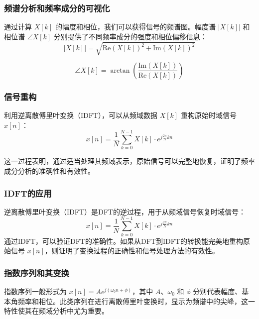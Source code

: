 \documentclass[a4paper,12pt]{article}
\begin{document}
\subsubsection{频谱分析和频率成分的可视化}

通过计算 \( X[k] \) 的幅度和相位，我们可以获得信号的频谱图。幅度谱 \( |X[k]| \) 和相位谱 \( \angle X[k] \) 分别提供了不同频率成分的强度和相位偏移信息：
\begin{equation}
|X[k]| = \sqrt{\text{Re}(X[k])^2 + \text{Im}(X[k])^2}
\end{equation}

\begin{equation}
\angle X[k] = \arctan\left(\frac{\text{Im}(X[k])}{\text{Re}(X[k])}\right)
\end{equation}


\subsubsection{信号重构}

利用逆离散傅里叶变换（IDFT），可以从频域数据 \( X[k] \) 重构原始时域信号 \( x[n] \)：
\begin{equation}
x[n] = \frac{1}{N} \sum_{k=0}^{N-1} X[k] \cdot e^{j\frac{2\pi}{N}kn}
\end{equation}

这一过程表明，通过适当处理其频域表示，原始信号可以完整地恢复，证明了频率成分分析的准确性和有效性。

\subsubsection{IDFT的应用}
逆离散傅里叶变换（IDFT）是DFT的逆过程，用于从频域信号恢复时域信号：
\begin{equation}
x[n] = \frac{1}{N} \sum_{k=0}^{N-1} X[k] \cdot e^{j\frac{2\pi}{N}kn}
\end{equation}
通过IDFT，可以验证DFT的准确性。如果从DFT到IDFT的转换能完美地重构原始信号 \( x[n] \)，则证明了变换过程的正确性和信号处理方法的有效性。

\subsubsection{指数序列和其变换}

指数序列一般形式为 \( x[n] = A e^{j(\omega_0 n + \phi)} \)，其中 \( A \)、\( \omega_0 \) 和 \( \phi \) 分别代表幅度、基本角频率和相位。此类序列在进行离散傅里叶变换时，显示为频谱中的尖峰，这一特性使其在频域分析中尤为重要。
\end{document}
